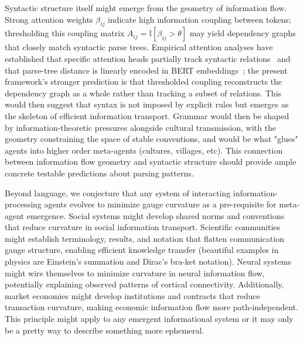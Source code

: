 \documentclass[11pt]{article}
\begin{document}
Syntactic structure itself might emerge from the geometry of information flow. Strong attention weights $\beta_{ij}$ indicate high information coupling between tokens; thresholding this coupling matrix $A_{ij} = \mathbb{I}[\beta_{ij} > \theta]$ may yield dependency graphs that closely match syntactic parse trees. Empirical attention analyses have established that specific attention heads partially track syntactic relations~\cite{Clark2019} and that parse-tree distance is linearly encoded in BERT embeddings~\cite{Hewitt2019, Voita2019}; the present framework's stronger prediction is that thresholded coupling reconstructs the dependency graph as a whole rather than tracking a subset of relations. This would then suggest that syntax is not imposed by explicit rules but emerges as the skeleton of efficient information transport. Grammar would then be shaped by information-theoretic pressures alongside cultural transmission, with the geometry constraining the space of stable conventions, and would be what "glues" agents into higher order meta-agents (cultures, villages, etc). This connection between information flow geometry and syntactic structure should provide ample concrete testable predictions about parsing patterns.

Beyond language, we conjecture that any system of interacting information-processing agents evolves to minimize gauge curvature as a pre-requisite for meta-agent emergence. Social systems might develop shared norms and conventions that reduce curvature in social information transport. Scientific communities might establish terminology, results, and notation that flatten communication gauge structure, enabling efficient knowledge transfer (beautiful examples in physics are Einstein's summation and Dirac's bra-ket notation). Neural systems might wire themselves to minimize curvature in neural information flow, potentially explaining observed patterns of cortical connectivity. Additionally, market economies might develop institutions and contracts that reduce transaction curvature, making economic information flow more path-independent.  This principle might apply to any emergent informational system or it may only be a pretty way to describe something more ephemeral.
\end{document}
